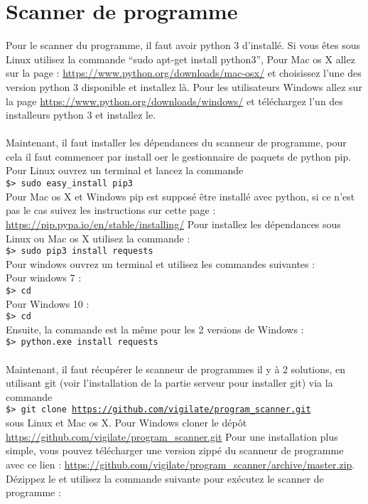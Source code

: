 \section{Scanner de programme}
Pour le scanner du programme, il faut avoir python 3 d’installé.
Si vous êtes sous Linux utilisez la commande “sudo apt-get install python3”, Pour Mac os X allez sur la page : \url{https://www.python.org/downloads/mac-osx/} et choisissez l’une des version python 3 disponible et installez là. Pour les utilisateurs Windows allez sur la page \url{https://www.python.org/downloads/windows/} et téléchargez l’un des installeurs python 3 et installez le.\\
\\
Maintenant, il faut installer les dépendances du scanneur de programme, pour cela il faut commencer par install oer le gestionnaire de paquets de python pip. Pour Linux ouvrez un terminal et lancez la commande\\
\texttt{\$> sudo easy\_install pip3}\\
Pour Mac os X et Windows pip est supposé être installé avec python, si ce n’est pas le cas suivez les instructions sur cette page : \url{https://pip.pypa.io/en/stable/installing/}
Pour installez les dépendances sous Linux ou Mac os X utilisez la commande :\\
\texttt{\$> sudo pip3 install requests}\\
Pour windows ouvrez un terminal et utilisez les commandes suivantes :\\
Pour windows 7 :\\
\texttt{\$> cd }\\
Pour Windows 10 :\\
\texttt{\$> cd }\\
Ensuite, la commande est la même pour les 2 versions de Windows :\\
\texttt{\$> python.exe  install requests}\\
\\
Maintenant, il faut récupérer le scanneur de programmes il y à 2 solutions, en utilisant git (voir l’installation de la partie serveur pour installer git) via la commande\\
\texttt{\$> git clone \url{https://github.com/vigilate/program_scanner.git}}\\
sous Linux et Mac os X. Pour Windows cloner le dépôt \url{https://github.com/vigilate/program_scanner.git}
Pour une installation plus simple, vous pouvez télécharger une version zippé du scanneur de programme avec ce lien : \url{https://github.com/vigilate/program_scanner/archive/master.zip}. Dézippez le et utilisez la commande suivante pour exécutez le scanner de programme :\\
